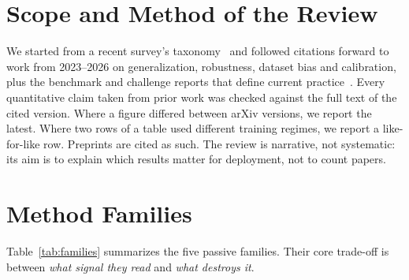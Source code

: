 \documentclass[conference]{IEEEtran}
\begin{document}
\section{Scope and Method of the Review}

We started from a recent survey's taxonomy~\cite{mahara2026review} and
followed citations forward to work from 2023--2026 on generalization,
robustness, dataset bias and calibration, plus the benchmark and challenge
reports that define current practice~\cite{zhu2023genimage,park2025commfor,pellegrini2025aigenbench,ntire2026robust,du2025forensichub,ren2026outofbox}.
Every quantitative claim taken from prior work was checked against the full
text of the cited version. Where a figure differed between arXiv versions, we
report the latest. Where two rows of a table used different training
regimes, we report a like-for-like row. Preprints are cited as such. The
review is narrative, not systematic: its aim is to explain which results
matter for deployment, not to count papers.

\section{Method Families}
\label{sec:families}

Table~\ref{tab:families} summarizes the five passive families. Their core
trade-off is between \emph{what signal they read} and \emph{what destroys it}.
\end{document}
